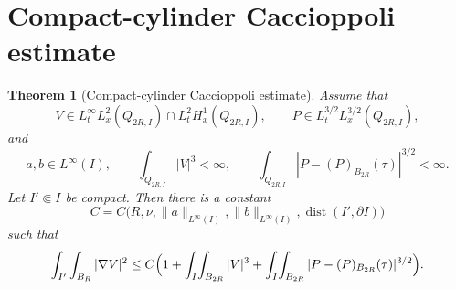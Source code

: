 \documentclass[11pt]{amsart}
\theoremstyle{plain}
\newtheorem{theorem}{Theorem}[section]
\theoremstyle{definition}
\begin{document}
\section{Compact-cylinder Caccioppoli estimate}

\begin{theorem}[Compact-cylinder Caccioppoli estimate]\label{thm:caccioppoli}
Assume that
\[
V\in L_t^\infty L_x^2(Q_{2R,I})\cap L_t^2 H_x^1(Q_{2R,I}),\qquad
P\in L_t^{3/2}L_x^{3/2}(Q_{2R,I}),
\]
and
\[
a,b\in L^\infty(I),\qquad
\int_{Q_{2R,I}}|V|^3<\infty,
\qquad
\int_{Q_{2R,I}}|P-(P)_{B_{2R}}(\tau)|^{3/2}<\infty.
\]
Let $I'\Subset I$ be compact. Then there is a constant
\[
C=C\bigl(R,\nu,\|a\|_{L^\infty(I)},\|b\|_{L^\infty(I)},
\operatorname{dist}(I',\partial I)\bigr)
\]
such that
\[
\int_{I'}\int_{B_R}|\nabla V|^2
\le C\Bigl(1+
\int_I\!\int_{B_{2R}}|V|^3+
\int_I\!\int_{B_{2R}}|P-(P)_{B_{2R}}(\tau)|^{3/2}
\Bigr).
\]
\end{theorem}
\end{document}

